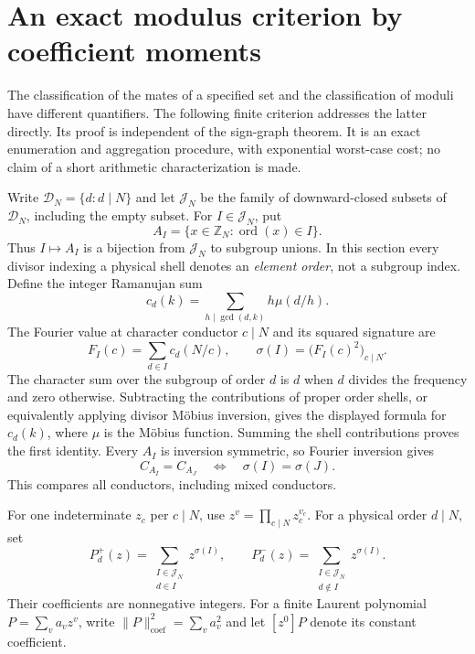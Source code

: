 \section{An exact modulus criterion by coefficient moments}
\label{v2:sec:moments}

The classification of the mates of a specified set and the classification of
moduli have different quantifiers.  The following finite criterion addresses
the latter directly.  Its proof is independent of the sign-graph theorem.  It
is an exact enumeration and aggregation procedure, with exponential worst-case
cost; no claim of a short arithmetic characterization is made.

Write $\mathcal D_N=\{d:d\mid N\}$ and let $\mathcal J_N$ be the family of
downward-closed subsets of $\mathcal D_N$, including the empty subset.  For
$I\in\mathcal J_N$, put
\[
 A_I=\{x\in\mathbb Z_N:\operatorname{ord}(x)\in I\}.
\]
Thus $I\mapsto A_I$ is a bijection from $\mathcal J_N$ to subgroup unions.
In this section every divisor indexing a physical shell denotes an
\emph{element order}, not a subgroup index.  Define the integer Ramanujan sum
\[
 c_d(k)=\sum_{h\mid\gcd(d,k)}h\mu(d/h).
\]
The Fourier value at character conductor $c\mid N$ and its squared signature
are
\begin{equation}\label{eq:moment-signature}
 F_I(c)=\sum_{d\in I}c_d(N/c),\qquad
 \sigma(I)=\bigl(F_I(c)^2\bigr)_{c\mid N}.
\end{equation}
The character sum over the subgroup of order $d$ is $d$ when $d$ divides the frequency and zero otherwise. Subtracting the contributions of proper order shells, or equivalently applying divisor M\"obius inversion, gives the displayed formula for $c_d(k)$, where $\mu$ is the M\"obius function. Summing the shell contributions proves the first identity.
Every $A_I$ is inversion symmetric, so Fourier inversion gives
\begin{equation}\label{eq:moment-signature-equivalence}
 C_{A_I}=C_{A_J}\quad\Longleftrightarrow\quad\sigma(I)=\sigma(J).
\end{equation}
This compares all conductors, including mixed conductors.

For one indeterminate $z_c$ per $c\mid N$, use
$z^v=\prod_{c\mid N}z_c^{v_c}$.  For a physical order $d\mid N$, set
\begin{equation}\label{eq:cut-polynomials}
 P_d^+(z)=\sum_{\substack{I\in\mathcal J_N\\d\in I}}z^{\sigma(I)},
 \qquad
 P_d^-(z)=\sum_{\substack{I\in\mathcal J_N\\d\notin I}}z^{\sigma(I)}.
\end{equation}
Their coefficients are nonnegative integers.  For a finite Laurent polynomial
$P=\sum_v a_vz^v$, write $\|P\|_{\mathrm{coef}}^2=\sum_v a_v^2$ and
let $[z^0]P$ denote its constant coefficient.

